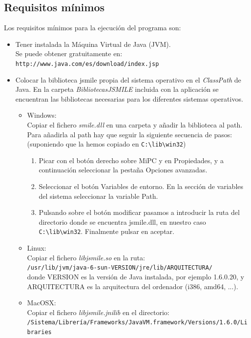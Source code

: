 \documentclass[a4paper,12pt]{article}
\begin{document}
\subsection{Requisitos mínimos}
Los requisitos mínimos para la ejecución del programa son:
\begin{itemize}
  \item Tener instalada la Máquina Virtual de Java (JVM).\\
	Se puede obtener gratuitamente en: \texttt{http://www.java.com/es/download/index.jsp}
  \item Colocar la biblioteca jsmile propia del sistema operativo en el \textit{ClassPath} de Java.
	En la carpeta \textit{BibliotecasJSMILE} incluida con la aplicación se encuentran las bibliotecas necesarias para los diferentes sistemas operativos.
	\begin{itemize}
	 \item Windows:\\
	  Copiar el fichero \textit{smile.dll} en una carpeta y añadir la biblioteca al path.
	  Para añadirla al path hay que seguir la siguiente secuencia de pasos:
	  (suponiendo que la hemos copiado en \texttt{C:\textbackslash lib\textbackslash win32})
		\begin{enumerate}
		 \item Picar con el botón derecho sobre MiPC y en Propiedades, y a continuación seleccionar la pestaña Opciones avanzadas.
		 \item Seleccionar el botón Variables de entorno. En la sección de variables del sistema seleccionar la variable Path.
		 \item Pulsando sobre el botón modificar pasamos a introducir la ruta del directorio donde se encuentra jsmile.dll, en nuestro caso \texttt{C:\textbackslash lib\textbackslash win32}. Finalmente pulsar en aceptar.
		\end{enumerate}
	 \item Linux:\\
	  Copiar el fichero \textit{libjsmile.so} en la ruta:\\ \texttt{/usr/lib/jvm/java-6-sun-VERSION/jre/lib/ARQUITECTURA/}\\

	  donde VERSION es la versión de Java instalada, por ejemplo 1.6.0.20, y ARQUITECTURA es la arquitectura del ordenador (i386, amd64, ...).		
	 \item MacOSX:\\
	  Copiar el fichero \textit{libjsmile.jnilib} en el directorio:\\ \texttt{/Sistema/Librería/Frameworks/JavaVM.framework/Versions/1.6.0/Libraries}

	\end{itemize}
\end{itemize}
\end{document}
